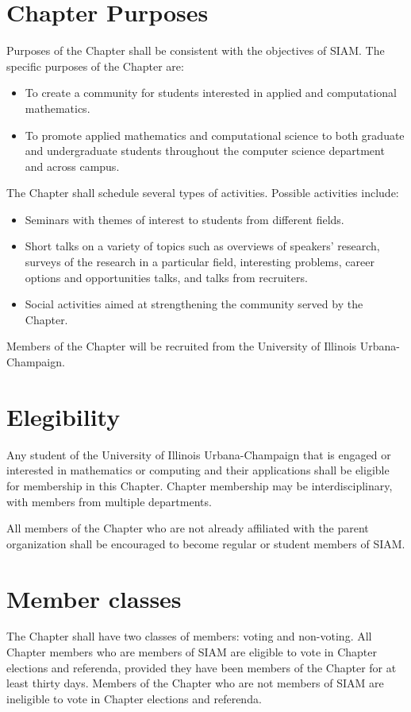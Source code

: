 \documentclass{ronr-bylaws}
\begin{document}
\section{Chapter Purposes}
Purposes of the Chapter shall be consistent with the objectives of SIAM. The specific purposes of
the Chapter are:
\begin{itemize}
\item To create a community for students interested in applied and computational mathematics.
\item To promote applied mathematics and computational science to both graduate and undergraduate
students throughout the computer science department and across campus.
\end{itemize}
The Chapter shall schedule several types of activities. Possible activities include:
\begin{itemize}
\item Seminars with themes of interest to students from different fields.
\item Short talks on a variety of topics such as overviews of speakers' research, surveys of the
research in a particular field, interesting problems, career options and opportunities talks, and
talks from recruiters.
\item Social activities aimed at strengthening the community served by the Chapter.
\end{itemize}
Members of the Chapter will be recruited from the University of Illinois Urbana-Champaign.

\section{Elegibility}
Any student of the University of Illinois Urbana-Champaign that is engaged or interested in
mathematics or computing and their applications shall be eligible for membership in this
Chapter. Chapter membership may be interdisciplinary, with members from multiple departments.

All members of the Chapter who are not already affiliated with the parent organization shall be
encouraged to become regular or student members of SIAM.

\section{Member classes}
The Chapter shall have two classes of members: voting and non-voting. All Chapter members who are
members of SIAM are eligible to vote in Chapter elections and referenda, provided they have been
members of the Chapter for at least thirty days. Members of the Chapter who are not members of SIAM
are ineligible to vote in Chapter elections and referenda.
\end{document}
